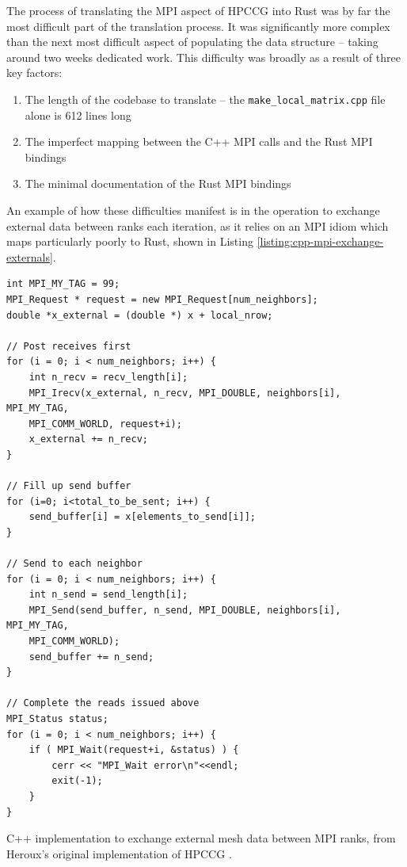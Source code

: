 The process of translating the MPI aspect of \acrshort{HPCCG} into Rust was by far the most difficult part of the translation process. It was significantly more complex than the next most difficult aspect of populating the data structure -- taking around two weeks dedicated work. This difficulty was broadly as a result of three key factors:

\begin{enumerate}
    \item The length of the codebase to translate -- the \texttt{make\_local\_matrix.cpp} file alone is 612 lines long
    \item The imperfect mapping between the C++ MPI calls and the Rust MPI bindings
    \item The minimal documentation of the Rust MPI bindings
\end{enumerate}

An example of how these difficulties manifest is in
the operation to exchange external data between ranks each iteration, as it relies on an MPI idiom which maps particularly poorly to Rust, shown in Listing \ref{listing:cpp-mpi-exchange-externals}.

\begin{code}
    \begin{verbatim}
int MPI_MY_TAG = 99;  
MPI_Request * request = new MPI_Request[num_neighbors];
double *x_external = (double *) x + local_nrow;

// Post receives first 
for (i = 0; i < num_neighbors; i++) {
    int n_recv = recv_length[i];
    MPI_Irecv(x_external, n_recv, MPI_DOUBLE, neighbors[i], MPI_MY_TAG, 
    MPI_COMM_WORLD, request+i);
    x_external += n_recv;
}

// Fill up send buffer
for (i=0; i<total_to_be_sent; i++) {
    send_buffer[i] = x[elements_to_send[i]];
}

// Send to each neighbor
for (i = 0; i < num_neighbors; i++) {
    int n_send = send_length[i];
    MPI_Send(send_buffer, n_send, MPI_DOUBLE, neighbors[i], MPI_MY_TAG, 
    MPI_COMM_WORLD);
    send_buffer += n_send;
}

// Complete the reads issued above
MPI_Status status;
for (i = 0; i < num_neighbors; i++) {
    if ( MPI_Wait(request+i, &status) ) {
        cerr << "MPI_Wait error\n"<<endl;
        exit(-1);
    }
}
    \end{verbatim}
    \caption{C++ implementation to exchange external mesh data between MPI ranks, from Heroux's original implementation of \acrshort{HPCCG} \cite{MantevoHPCCG2023}.}
    \label{listing:cpp-mpi-exchange-externals}
\end{code}

